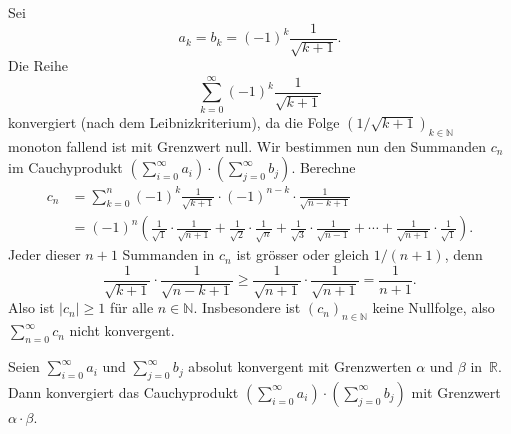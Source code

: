\documentclass[../main.tex]{subfiles}
\begin{document}
\begin{example}
  Sei 
  \[
    a_k = b_k = {(-1)}^k \frac{1}{\sqrt{k+1}}.
  \]
  Die Reihe
  \[
    \sum_{k=0}^{\infty} {(-1)}^k \frac{1}{\sqrt{k+1}}
  \]
  konvergiert (nach dem Leibnizkriterium),
  da die Folge ${(1/\sqrt{k+1})}_{k \in \mathbb{N}}$
  monoton fallend ist mit Grenzwert null.
  Wir bestimmen nun den Summanden $c_n$ im
  Cauchyprodukt
  $\left( \sum_{i=0}^{\infty} a_i \right) \cdot
  \left( \sum_{j=0}^{\infty} b_j \right)$.
  Berechne
  \begin{align*}
    c_n & = \sum_{k=0}^{n} {(-1)}^k \frac{1}{\sqrt{k+1}}
    \cdot {(-1)}^{n-k} \cdot \frac{1}{\sqrt{n-k+1}} \\
        &=
    (-1)^n \left(  
      \frac{1}{\sqrt 1} \cdot \frac{1}{\sqrt{n+1}}
      + \frac{1}{\sqrt 2} \cdot \frac{1}{\sqrt n}
      + \frac{1}{\sqrt 3} \cdot \frac{1}{\sqrt{n-1}}
      + \cdots
      + \frac{1}{\sqrt{n+1}} \cdot \frac{1}{\sqrt 1}
    \right).
  \end{align*}
Jeder dieser $n + 1$ Summanden in $c_n$ ist grösser oder
gleich $1/(n+1)$, denn
\[
  \frac{1}{\sqrt{k+1}}\cdot\frac{1}{\sqrt{n-k+1}}
  \geq \frac{1}{\sqrt{n+1}} \cdot \frac{1}{\sqrt{n+1}}
  = \frac{1}{n+1}.
\]
Also ist $|c_n| \geq 1$ für alle $n \in \mathbb{N}$.
Insbesondere ist ${(c_{n})}_{n \in \mathbb{N}}$ 
keine Nullfolge,
also $\sum_{n=0}^{\infty} c_n$ nicht konvergent.
\end{example}

\begin{theorem}\label{thm:cauchy-product}
  Seien
  $\sum_{i=0}^{\infty} a_i$ und $\sum_{j=0}^{\infty} b_j$ 
  absolut konvergent mit Grenzwerten $\alpha$ und $\beta$ 
  in~$\mathbb{R}$.
  Dann konvergiert das Cauchyprodukt
  $\left( \sum_{i=0}^{\infty} a_i \right) \cdot
  \left( \sum_{j=0}^{\infty} b_j \right)$ mit
  Grenzwert $\alpha \cdot \beta$.
\end{theorem}

\end{document}
